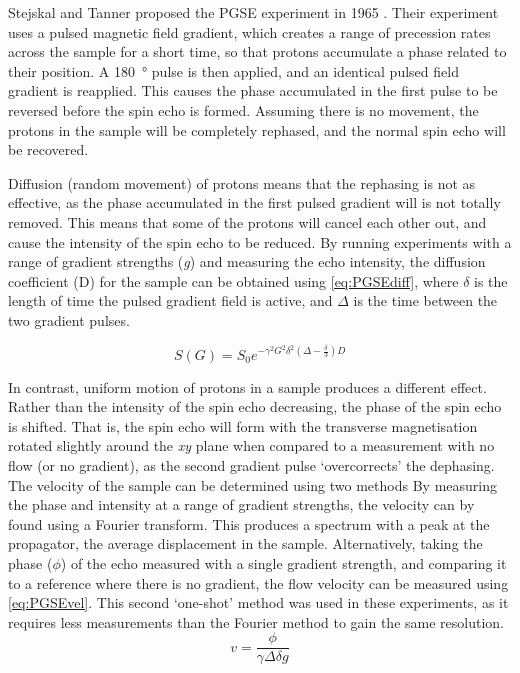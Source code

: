 Stejskal and Tanner proposed the PGSE experiment in 1965 \cite{StejskalSpinDiffusionMeasurements1965}.
Their experiment uses a pulsed magnetic field gradient, which creates a range of precession rates across the sample for a short time, so that protons accumulate a phase related to their position.
A \SI{180}{\degree} pulse is then applied, and an identical pulsed field gradient is reapplied.
This causes the phase accumulated in the first pulse to be reversed before the spin echo is formed.
Assuming there is no movement, the protons in the sample will be completely rephased, and the normal spin echo will be recovered.

Diffusion (random movement) of protons means that the rephasing is not as effective, as the phase accumulated in the first pulsed gradient will is not totally removed.
This means that some of the protons will cancel each other out, and cause the intensity of the spin echo to be reduced.
By running experiments with a range of gradient strengths (\textit{g}) and measuring the echo intensity, the diffusion coefficient (D) for the sample can be obtained using \autoref{eq:PGSEdiff}, where $\delta$ is the length of time the pulsed gradient field is active, and $\Delta$ is the time between the two gradient pulses.

\begin{equation}
S(G) = S_0 e^{-\gamma^2 G^2 \delta^2 (\Delta - \frac{\delta}{3} ) D}
\label{eq:PGSEdiff}
\end{equation}

In contrast, uniform motion of protons in a sample produces a different effect.
Rather than the intensity of the spin echo decreasing, the phase of the spin echo is shifted.
That is, the spin echo will form with the transverse magnetisation rotated slightly around the \textit{xy} plane when compared to a measurement with no flow (or no gradient), as the second gradient pulse `overcorrects' the dephasing.
The velocity of the sample can be determined using two methods \cite{CallaghanVelocitydiffusionimaging1991,XiaOneshotvelocitymicroscopy1992,CallaghanTranslationalDynamicsMagnetic2014}
By measuring the phase and intensity at a range of gradient strengths, the velocity can by found using a Fourier transform.
This produces a spectrum with a peak at the propagator, the average displacement in the sample.
Alternatively, taking the phase ($\phi$) of the echo measured with a single gradient strength, and comparing it to a reference where there is no gradient, the flow velocity can be measured using \autoref{eq:PGSEvel}.
This second `one-shot' method was used in these experiments, as it requires less measurements than the Fourier method to gain the same resolution.
\begin{equation}
v = \frac{\phi}{\gamma \Delta \delta g}
\label{eq:PGSEvel}
\end{equation}

